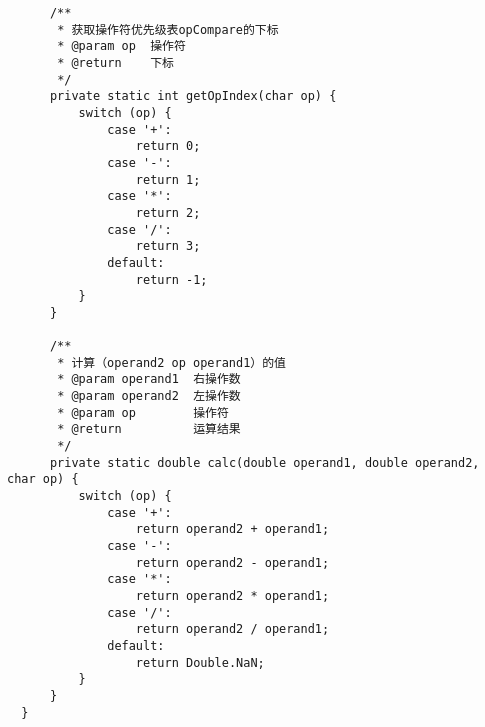 \documentclass{article}
\begin{document}
\begin{verbatim}
      /**
       * 获取操作符优先级表opCompare的下标
       * @param op  操作符
       * @return    下标
       */
      private static int getOpIndex(char op) {
          switch (op) {
              case '+':
                  return 0;
              case '-':
                  return 1;
              case '*':
                  return 2;
              case '/':
                  return 3;
              default:
                  return -1;
          }
      }

      /**
       * 计算（operand2 op operand1）的值
       * @param operand1  右操作数
       * @param operand2  左操作数
       * @param op        操作符
       * @return          运算结果
       */
      private static double calc(double operand1, double operand2, char op) {
          switch (op) {
              case '+':
                  return operand2 + operand1;
              case '-':
                  return operand2 - operand1;
              case '*':
                  return operand2 * operand1;
              case '/':
                  return operand2 / operand1;
              default:
                  return Double.NaN;
          }
      }
  }
  \end{verbatim}
\end{document}
